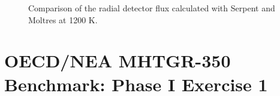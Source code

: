 \begin{figure}[htbp!]
	\centering
	\hfill
	\caption{Comparison of the radial detector flux calculated with Serpent and Moltres at 1200 K.}
	\label{fig:fullcore-1200-radial1}
\end{figure}


\section{OECD/NEA MHTGR-350 Benchmark: Phase I Exercise 1}
\label{sec:ph1e1}

